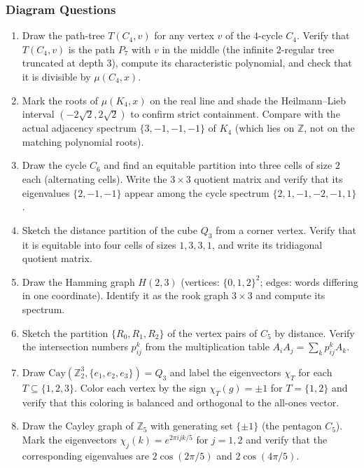 \subsubsection{Diagram Questions}
\begin{enumerate}[resume]
\item Draw the path-tree $T(C_4, v)$ for any vertex $v$ of the $4$-cycle
$C_4$. Verify that $T(C_4, v)$ is the path $P_7$ with $v$ in the middle
(the infinite $2$-regular tree truncated at depth $3$), compute its
characteristic polynomial, and check that it is divisible by
$\mu(C_4, x)$.

\item Mark the roots of $\mu(K_4, x)$ on the real line and shade the
Heilmann--Lieb interval $(-2\sqrt{2}, 2\sqrt{2})$ to confirm strict
containment. Compare with the actual adjacency spectrum
$\{3, -1, -1, -1\}$ of $K_4$ (which lies on $\mathbb{Z}$, not on the
matching polynomial roots).

\item Draw the cycle $C_6$ and find an equitable partition into three cells
of size $2$ each (alternating cells). Write the $3 \times 3$ quotient
matrix and verify that its eigenvalues $\{2, -1, -1\}$ appear among
the cycle spectrum $\{2, 1, -1, -2, -1, 1\}$.

\item Sketch the distance partition of the cube $Q_3$ from a corner vertex.
Verify that it is equitable into four cells of sizes $1, 3, 3, 1$, and
write its tridiagonal quotient matrix.

\item Draw the Hamming graph $H(2, 3)$ (vertices: $\{0, 1, 2\}^2$; edges:
words differing in one coordinate). Identify it as the rook graph
$3 \times 3$ and compute its spectrum.

\item Sketch the partition $\{R_0, R_1, R_2\}$ of the vertex pairs of $C_5$
by distance. Verify the intersection numbers $p_{ij}^k$ from the
multiplication table $A_i A_j = \sum_k p_{ij}^k A_k$.

\item Draw $\mathrm{Cay}(\mathbb Z_2^3, \{e_1, e_2, e_3\}) = Q_3$ and label
the eigenvectors $\chi_T$ for each $T \subseteq \{1, 2, 3\}$. Color
each vertex by the sign $\chi_T(g) = \pm 1$ for $T = \{1, 2\}$ and
verify that this coloring is balanced and orthogonal to the all-ones
vector.

\item Draw the Cayley graph of $\mathbb Z_5$ with generating set
$\{\pm 1\}$ (the pentagon $C_5$). Mark the eigenvectors
$\chi_j(k) = e^{2\pi i j k/5}$ for $j = 1, 2$ and verify that the
corresponding eigenvalues are $2 \cos(2\pi/5)$ and $2 \cos(4\pi/5)$.


\end{enumerate}
